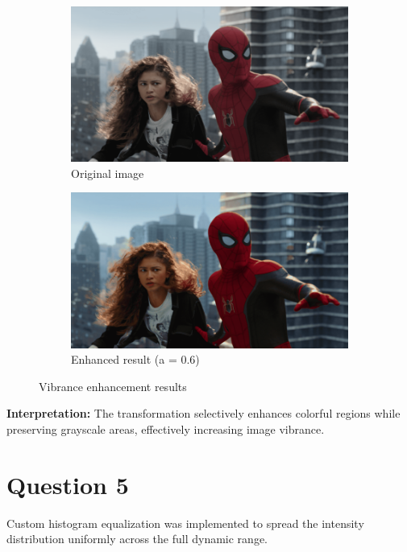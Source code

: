 \documentclass[10pt,a4paper]{article}
\begin{document}
\begin{figure}[H]
    \centering
    \begin{subfigure}{0.48\textwidth}
        \includegraphics[width=\textwidth]{task4/original.png}
        \caption{Original image}
    \end{subfigure}
    \begin{subfigure}{0.48\textwidth}
        \includegraphics[width=\textwidth]{task4/enhanced.png}
        \caption{Enhanced result (a = 0.6)}
    \end{subfigure}
    \caption{Vibrance enhancement results}
\end{figure}

\textbf{Interpretation:} The transformation selectively enhances colorful regions while preserving grayscale areas, effectively increasing image vibrance.

\section{Question 5}
Custom histogram equalization was implemented to spread the intensity distribution uniformly across the full dynamic range.
\end{document}
